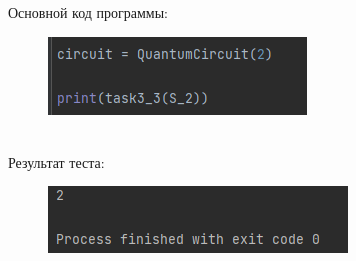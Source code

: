 \documentclass{article}
\begin{document}
Основной код программы:\\
\begin{figure}[h]
        \centering
        \includegraphics{pictures/main3.3.png}
   \end{figure}\\
   
Результат теста:\\
\begin{figure}[h]
        \centering
        \includegraphics{pictures/test3.3.png}
   \end{figure}\\
\end{document}
